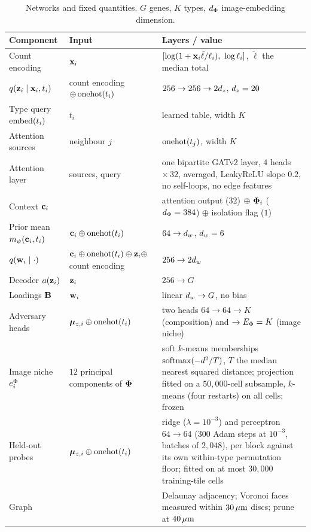 \begin{table}[!htbp]
\centering
\caption{Networks and fixed quantities. $G$ genes, $K$ types, $d_{\Phi}$ image-embedding dimension.}
\label{tab:architecture}
\footnotesize
\begin{tabular}{@{}p{}p{}p{}@{}}
\toprule
Component & Input & Layers / value \\
\midrule
Count encoding & $\mathbf{x}_i$ & $[\log(1 + \mathbf{x}_i \tilde\ell/\ell_i),\ \log\ell_i]$, $\tilde\ell$ the median total \\
$q(\mathbf{z}_i \mid \mathbf{x}_i, t_i)$ & count encoding $\oplus \operatorname{onehot}(t_i)$ & $256 \to 256 \to 2d_z$, $d_z = 20$ \\
Type query $\operatorname{embed}(t_i)$ & $t_i$ & learned table, width $K$ \\
Attention sources & neighbour $j$ & $\operatorname{onehot}(t_j)$, width $K$ \\
Attention layer & sources, query & one bipartite GATv2 layer, $4$ heads $\times\, 32$, averaged, LeakyReLU slope $0.2$, no self-loops, no edge features \\
Context $\mathbf{c}_i$ & & attention output ($32$) $\oplus\ \boldsymbol{\Phi}_i$ ($d_{\Phi} = 384$) $\oplus$ isolation flag ($1$) \\
Prior mean $m_{\psi}(\mathbf{c}_i, t_i)$ & $\mathbf{c}_i \oplus \operatorname{onehot}(t_i)$ & $64 \to d_w$, $d_w = 6$ \\
$q(\mathbf{w}_i \mid \cdot)$ & $\mathbf{c}_i \oplus \operatorname{onehot}(t_i) \oplus \mathbf{z}_i \oplus$ count encoding & $256 \to 2d_w$ \\
Decoder $a(\mathbf{z}_i)$ & $\mathbf{z}_i$ & $256 \to G$ \\
Loadings $\mathbf{B}$ & $\mathbf{w}_i$ & linear $d_w \to G$, no bias \\
Adversary heads & $\boldsymbol{\mu}_{z,i} \oplus \operatorname{onehot}(t_i)$ & two heads $64 \to 64 \to K$ (composition) and $\to E_{\Phi} = K$ (image niche) \\
Image niche $e^{\Phi}_i$ & $12$ principal components of $\boldsymbol{\Phi}$ & soft $k$-means memberships $\operatorname{softmax}(-d^2/T)$, $T$ the median nearest squared distance; projection fitted on a $50{,}000$-cell subsample, $k$-means (four restarts) on all cells; frozen \\
Held-out probes & $\boldsymbol{\mu}_{z,i} \oplus \operatorname{onehot}(t_i)$ & ridge ($\lambda = 10^{-3}$) and perceptron $64 \to 64$ ($300$ Adam steps at $10^{-3}$, batches of $2{,}048$), per block against its own within-type permutation floor; fitted on at most $30{,}000$ training-tile cells \\
\midrule
Graph & & Delaunay adjacency; Voronoi faces measured within $30\,\mu\text{m}$ discs; prune at $40\,\mu\text{m}$ \\

\end{tabular}
\end{table}
